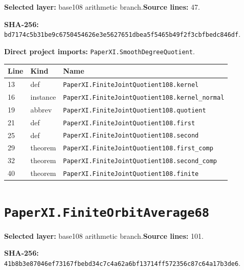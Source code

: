 \documentclass[10pt,oneside]{book}
\begin{document}
\textbf{Selected layer:} base108 arithmetic branch.\quad\textbf{Source lines:} 47.\par\textbf{SHA-256:} {\scriptsize\nolinkurl{bd7174c5b31be9c6750454626e3e5627651dbea5f5465b49f2f3cbfbedc846df}}.


\textbf{Direct project imports:} \nolinkurl{PaperXI.SmoothDegreeQuotient}.

\begin{longtable}{@{}p{}p{}p{}@{}}\toprule Line&Kind&Name\\\midrule\endhead

13&def&\nolinkurl{PaperXI.FiniteJointQuotient108.kernel}\\

16&instance&\nolinkurl{PaperXI.FiniteJointQuotient108.kernel_normal}\\

19&abbrev&\nolinkurl{PaperXI.FiniteJointQuotient108.quotient}\\

21&def&\nolinkurl{PaperXI.FiniteJointQuotient108.first}\\

25&def&\nolinkurl{PaperXI.FiniteJointQuotient108.second}\\

29&theorem&\nolinkurl{PaperXI.FiniteJointQuotient108.first_comp}\\

32&theorem&\nolinkurl{PaperXI.FiniteJointQuotient108.second_comp}\\

40&theorem&\nolinkurl{PaperXI.FiniteJointQuotient108.finite}\\

\bottomrule\end{longtable}

\section{\texorpdfstring{\nolinkurl{PaperXI.FiniteOrbitAverage68}}{PaperXI.FiniteOrbitAverage68}}\label{module:PaperXI.FiniteOrbitAverage68}

\textbf{Selected layer:} base108 arithmetic branch.\quad\textbf{Source lines:} 101.\par\textbf{SHA-256:} {\scriptsize\nolinkurl{41b8b3e87046ef73167fbebd34c7c4a62a6bf13714ff572356c87c64a17b3de6}}.
\end{document}
